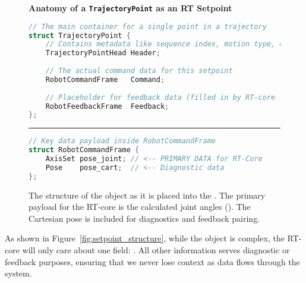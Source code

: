 \begin{figure}[htbp!]
    \centering
    \begin{tcolorbox}[
        width=\textwidth, 
        sharp corners, 
        title=The Setpoint Data Structure,
        fonttitle=\bfseries
    ]
    
    \begin{center}
    \textbf{Anatomy of a \texttt{TrajectoryPoint} as an RT Setpoint}
    \end{center}
    
    
    \begin{lstlisting}[language=C++, basicstyle=\ttfamily\small]
// The main container for a single point in a trajectory
struct TrajectoryPoint {
    // Contains metadata like sequence index, motion type, etc.
    TrajectoryPointHead Header;
    
    // The actual command data for this setpoint
    RobotCommandFrame   Command;
    
    // Placeholder for feedback data (filled in by RT-core later)
    RobotFeedbackFrame  Feedback; 
};
    \end{lstlisting}
    
    \hrule\vspace{0.2cm} %
    
    \begin{lstlisting}[language=C++, basicstyle=\ttfamily\small]
// Key data payload inside RobotCommandFrame
struct RobotCommandFrame {
    AxisSet pose_joint; // <-- PRIMARY DATA for RT-Core
    Pose    pose_cart;  // <-- Diagnostic data
};
    \end{lstlisting}
    
    \end{tcolorbox}
    \caption{The structure of the  object as it is placed into the . The primary payload for the RT-core is the calculated joint angles (). The Cartesian pose is included for diagnostics and feedback pairing.}
    \label{fig:setpoint_structure_listing}
\end{figure}

As shown in Figure~\ref{fig:setpoint_structure}, while the object is complex, the RT-core will only care about one field: . All other information serves diagnostic or feedback purposes, ensuring that we never lose context as data flows through the system.

